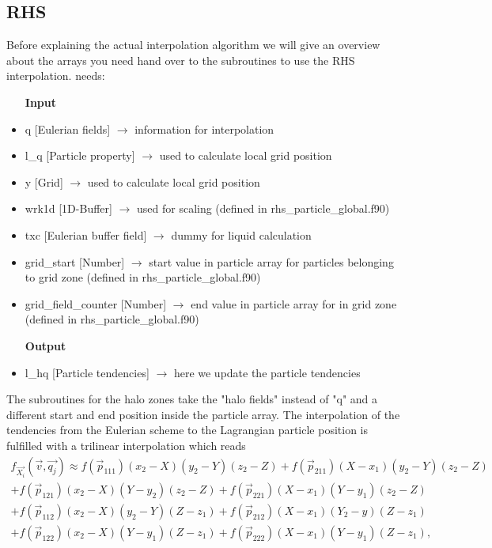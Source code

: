 \documentclass[12pt]{article}
\begin{document}
\subsection{RHS}
Before explaining the actual interpolation algorithm we will give an overview about the arrays you need hand over to the subroutines to use the RHS interpolation.  needs:
\begin{itemize}
	\item [\textbf{Input}]
	\item q [Eulerian fields] $\rightarrow$ information for interpolation
	\item l\_q [Particle property] $\rightarrow$ used to calculate local grid position
	\item y [Grid] $\rightarrow$ used to calculate local grid position
	\item wrk1d [1D-Buffer] $\rightarrow$ used for scaling (defined in rhs\_particle\_global.f90)
	\item txc [Eulerian buffer field] $\rightarrow$ dummy for liquid calculation
	\item grid\_start [Number] $\rightarrow$ start value in particle array for particles belonging to grid zone (defined in rhs\_particle\_global.f90)
	\item grid\_field\_counter [Number] $\rightarrow$ end value in particle array for in grid zone (defined in rhs\_particle\_global.f90)
	\item [\textbf{Output}]
	\item l\_hq [Particle tendencies] $\rightarrow$ here we update the particle tendencies
\end{itemize}
The subroutines for the halo zones take the "halo fields" instead of "q" and a different start and end position inside the particle array.\newline
The interpolation of the tendencies from the Eulerian scheme to the Lagrangian particle position is fulfilled with a trilinear interpolation which reads
\begin{equation}
\begin{split}
f_{\vec{X_i}}(\vec{v},\vec{q_j}) \approx f(\vec{p}_{111})(x_2-X)(y_2-Y)(z_2-Z)
+f(\vec{p}_{211})(X-x_1)(y_2-Y)(z_2-Z)\\
+f(\vec{p}_{121})(x_2-X)(Y-y_2)(z_2-Z)
+f(\vec{p}_{221})(X-x_1)(Y-y_1)(z_2-Z)\\
+f(\vec{p}_{112})(x_2-X)(y_2-Y)(Z-z_1)
+f(\vec{p}_{212})(X-x_1)(Y_2-y)(Z-z_1)\\
+f(\vec{p}_{122})(x_2-X)(Y-y_1)(Z-z_1)
+f(\vec{p}_{222})(X-x_1)(Y-y_1)(Z-z_1),
\end{split}
\label{eqn:interpolation}
\end{equation}
\end{document}
